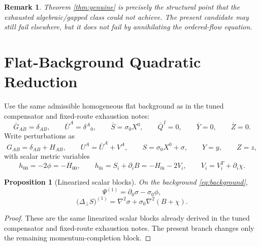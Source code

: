 \documentclass[11pt]{article}
\newtheorem{proposition}{Proposition}
\newtheorem{remark}{Remark}
\begin{document}
\begin{remark}
Theorem \ref{thm:genuine} is precisely the structural point that the exhausted algebraic/gapped class could not achieve. The present candidate may still fail elsewhere, but it does \emph{not} fail by annihilating the ordered-flow equation.
\end{remark}

\section{Flat-Background Quadratic Reduction}

Use the same admissible homogeneous flat background as in the tuned compensator and fixed-route exhaustion notes:
\begin{equation}
\bar G_{AB}=\delta_{AB},
\qquad
\bar U^A=\delta^A{}_0,
\qquad
\bar S=\sigma_0X^0,
\qquad
\bar Q^I=0,
\qquad
\bar Y=0,
\qquad
\bar Z=0.
\label{eq:background}
\end{equation}
Write perturbations as
\begin{equation}
G_{AB}=\delta_{AB}+H_{AB},
\qquad
U^A=\bar U^A+V^A,
\qquad
S=\sigma_0X^0+\sigma,
\qquad
Y=y,
\qquad
Z=z,
\label{eq:perturb}
\end{equation}
with scalar metric variables
\begin{equation}
h_{00}=-2\phi=-H_{00},
\qquad
h_{0i}=S_i+\partial_iB=-H_{0i}-2V_i,
\qquad
V_i=V_i^T+\partial_i\chi.
\label{eq:metricpert}
\end{equation}

\begin{proposition}[Linearized scalar blocks]
\label{prop:lin}
On the background \eqref{eq:background},
\begin{equation}
\Psi^{(1)}
=
\partial_0\sigma-\sigma_0\phi,
\label{eq:Psilin}
\end{equation}
\begin{equation}
\bigl(\Delta_\perp S\bigr)^{(1)}
=
\nabla^2\sigma+\sigma_0\nabla^2(B+\chi).
\label{eq:Xilin}
\end{equation}
\end{proposition}

\begin{proof}
These are the same linearized scalar blocks already derived in the tuned compensator and fixed-route exhaustion notes. The present branch changes only the remaining momentum-completion block.
\end{proof}
\end{document}
